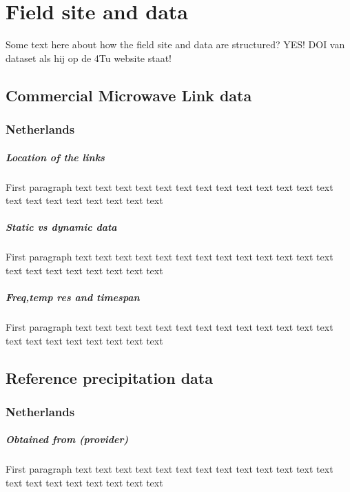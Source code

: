 \documentclass[twocolumn, 10pt, a4paper]{memoir}
\begin{document}
	
	
	
	
	
	
	\cleardoublepage
	\chapter{Field site and data}\vspace{-6mm}
	\label{ch: field}
	Some text here about how the field site and data are structured? YES!
	DOI van dataset als hij op de 4Tu website staat! 
	
	\section{Commercial Microwave Link data}
	\subsection{Netherlands}
	\paragraph{Location of the links}
	First paragraph
	text text text text text text text text text text text text text text text text text text text text text
	\paragraph{Static vs dynamic data}
	First paragraph
	text text text text text text text text text text text text text text text text text text text text text
	\paragraph{Freq,temp res and timespan}
	First paragraph
	text text text text text text text text text text text text text text text text text text text text text
	
	\section{Reference precipitation data}
	\subsection{Netherlands}
	\paragraph{Obtained from (provider)}
	First paragraph
	text text text text text text text text text text text text text text text text text text text text text
\end{document}
